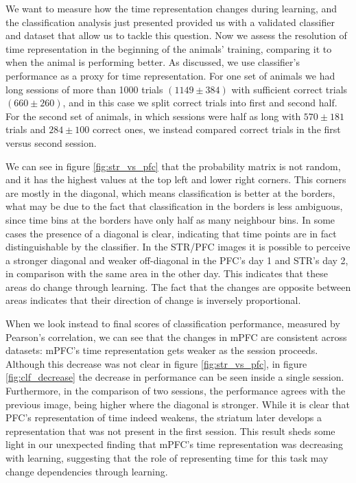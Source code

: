 We want to measure how the time representation changes during learning, and the classification analysis just presented provided us with a validated classifier and dataset that allow us to tackle this question. Now we assess the resolution of time representation in the beginning of the animals' training, comparing it to when the animal is performing better. As discussed, we use classifier's performance as a proxy for time representation. For one set of animals we had long sessions of more than 1000 trials $(1149 \pm 384)$ with sufficient correct trials $(660 \pm 260)$, and in this case we split correct trials into first and second half. For the second set of animals, in which sessions were half as long with $570 \pm 181$ trials and $284\pm 100$ correct ones, we instead compared correct trials in the first versus second session. 

We can see in figure \ref{fig:str_vs_pfc} that the probability matrix is not random, and it has the highest values at the top left and lower right corners. This corners are mostly in the diagonal, which means classification is better at the borders, what may be due to the fact that classification in the borders is less ambiguous, since time bins at the borders have only half as many neighbour bins. In some cases the presence of a diagonal is clear, indicating that time points are in fact distinguishable by the classifier. In the STR/PFC images it is possible to perceive a stronger diagonal and weaker off-diagonal in the PFC's day 1 and STR's day 2, in comparison with the same area in the other day. This indicates that these areas do change through learning. The fact that the changes are opposite between areas indicates that their direction of change is inversely proportional.

When we look instead to final scores of classification performance, measured by Pearson's correlation, we can see that the changes in mPFC are consistent across datasets:  mPFC's time representation gets weaker as the session proceeds. Although this decrease was not clear in figure \ref{fig:str_vs_pfc}, in figure \ref{fig:clf_decrease} the decrease in performance can be seen inside a single session. Furthermore, in the comparison of two sessions, the performance agrees with the previous image, being higher where the diagonal is stronger. While it is clear that PFC's representation of time indeed weakens, the striatum later develops a representation that was not present in the first session. This result sheds some light in our unexpected finding that mPFC's time representation was decreasing with learning, suggesting that the role of representing time for this task may change dependencies through learning.

